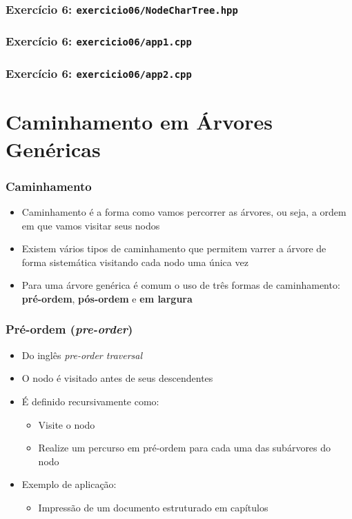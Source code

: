 \documentclass[aspectratio=169]{beamer}
\begin{document}
\begin{frame}[fragile]\frametitle{Exercício 6: \texttt{exercicio06/NodeCharTree.hpp}}
\fontsize{3pt}{5pt}\selectfont{

}
\end{frame}

\begin{frame}[fragile]\frametitle{Exercício 6: \texttt{exercicio06/app1.cpp}}
\fontsize{6pt}{6pt}\selectfont{

}
\end{frame}

\begin{frame}[fragile]\frametitle{Exercício 6: \texttt{exercicio06/app2.cpp}}
\fontsize{3pt}{5pt}\selectfont{

}
\end{frame}

\section{Caminhamento em Árvores Genéricas}

\begin{frame}\frametitle{Caminhamento}
\begin{itemize}
	\item Caminhamento é a forma como vamos percorrer as árvores, ou seja, a ordem em que vamos visitar seus nodos
	\item Existem vários tipos de caminhamento que permitem varrer a árvore de forma sistemática visitando cada nodo uma única vez
	\item Para uma árvore genérica é comum o uso de três formas de caminhamento: \textbf{pré-ordem}, \textbf{pós-ordem} e \textbf{em largura}
\end{itemize}
\end{frame}

\begin{frame}\frametitle{Pré-ordem (\emph{pre-order})}
\begin{itemize}
	\item Do inglês \emph{pre-order traversal}
	\item O nodo é visitado antes de seus descendentes
	\item É definido recursivamente como:
	\begin{itemize}
		\item Visite o nodo
		\item Realize um percurso em pré-ordem para cada uma das subárvores do nodo
	\end{itemize}
	\item Exemplo de aplicação:
	\begin{itemize}
		\item Impressão de um documento estruturado em capítulos
	\end{itemize}
\end{itemize}
\end{frame}
\end{document}
